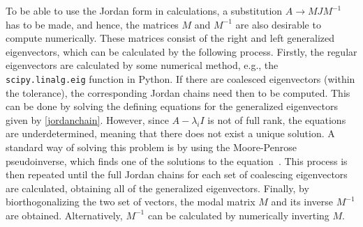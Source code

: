 \documentclass[../main.tex]{subfiles}
\begin{document}
To be able to use the Jordan form in calculations, a substitution $A\rightarrow MJM^{-1}$ has to be made, and hence, the matrices $M$ and $M^{-1}$ are also desirable to compute numerically. These matrices consist of the right and left generalized eigenvectors, which can be calculated by the following process. Firstly, the regular eigenvectors are calculated by some numerical method, e.g., the \verb+scipy.linalg.eig+ function in Python. If there are coalesced eigenvectors (within the tolerance), the corresponding Jordan chains need then to be computed. This can be done by solving the defining equations for the generalized eigenvectors given by \cref{jordanchain}. However, since $A-\lambda_iI$ is not of full rank, the equations are underdetermined, meaning that there does not exist a unique solution. A standard way of solving this problem is by using the Moore-Penrose pseudoinverse, which finds one of the solutions to the equation~\cite{uffe}. This process is then repeated until the full Jordan chains for each set of coalescing eigenvectors are calculated, obtaining all of the generalized eigenvectors. Finally, by biorthogonalizing the two set of vectors, the modal matrix $M$ and its inverse $M^{-1}$ are obtained. Alternatively, $M^{-1}$ can be calculated by numerically inverting $M$. 


\end{document}
